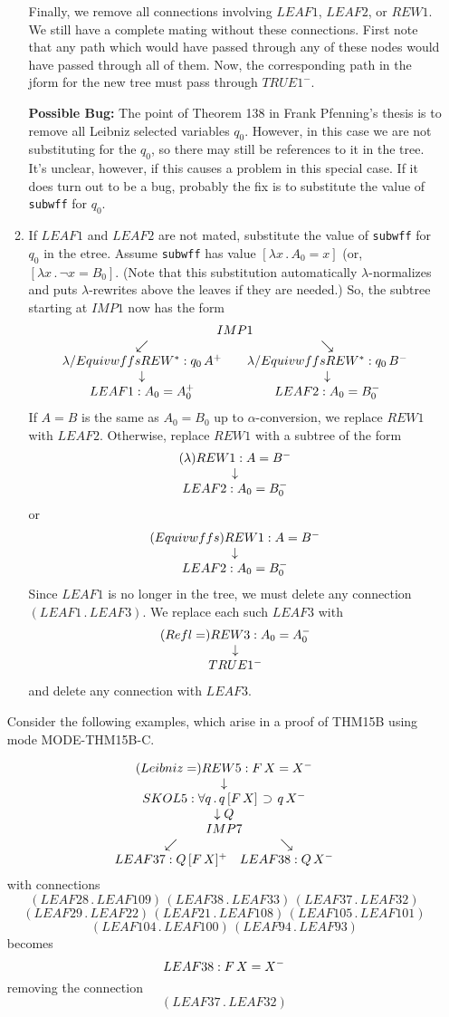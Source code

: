 \begin{enumerate}
\begin{enumerate}
Finally, we remove all connections involving $LEAF1$, $LEAF2$, or
$REW1$.  
We still have a complete mating without these connections.
First note that any path which would have passed through any of these nodes
would have passed through all of them.  Now, the corresponding path
in the jform for the new tree must pass through $TRUE1^-$.

{\bf Possible Bug:}  The point of Theorem 138
in Frank Pfenning's thesis\cite{Pfenning86} is to remove all Leibniz selected variables $q_0$.
However, in this case we are not substituting for the $q_0$, so there may
still be references to it in the tree.  It's unclear, however, if this
causes a problem in this special case.  If it does turn out to be a bug,
probably the fix is to substitute 
the value of \verb+subwff+ for $q_0$.


\item  If $LEAF1$ and $LEAF2$ are not mated, substitute the value of \verb+subwff+
for $q_0$ in the etree.  Assume \verb+subwff+ has value $[\lambda x\, . \, A_0 = x]$ (or, $[\lambda x\, . \, \lnot x = B_0]$.
(Note that this substitution automatically $\lambda$-normalizes and puts $\lambda$-rewrites above the leaves
if they are needed.)  So, the subtree starting at $IMP1$ now has the form
$$\eimp{1}{q_0\, A\, \limplies \, q_0\, B^-}
{\erewstar{\lambda/Equivwffs}{q_0\, A^+}{\eleaf{1}{A_0 = A_0^+}}}
{\erewstar{\lambda/Equivwffs}{q_0\, B^-}{\eleaf{2}{A_0 = B_0^-}}}$$
If $A = B$ is the same as $A_0 = B_0$ up to $\alpha$-conversion,
we replace $REW1$ with $LEAF2$.
Otherwise, replace $REW1$ with a subtree of the form
$$\erew{1}{\lambda}{A = B^-}{\eleaf{2}{A_0 = B_0^-}}$$
or
$$\erew{1}{Equivwffs}{A = B^-}{\eleaf{2}{A_0 = B_0^-}}$$
Since $LEAF1$ is no longer in the tree, we must
delete any connection $(LEAF1 \, . \, LEAF3)$.
We replace each such $LEAF3$ with
$$\erew{3}{Refl=}{A_0 = A_0^-}{\truenode{1^-}}$$
and delete any connection with $LEAF3$.
\end{enumerate}

Consider the following examples, which arise in a proof
of THM15B using mode MODE-THM15B-C.

$$\erew{5}{Leibniz=}{F\, X = X^-}{\skol{5}
{\forall q \, . \, q\, [F\, X] \, \limplies \, q\, X^-}
{Q}
{\eimp{7}{Q\, [F\, X]\,\limplies\, Q\, X^-}
{\eleaf{37}{Q \, [F \, X]^+}}
{\eleaf{38}{Q \, X^-}}}}$$
with connections
$$(LEAF28\, .\, LEAF109)\, (LEAF38\, .\, LEAF33)\, (LEAF37\, .\, LEAF32)$$
$$(LEAF29\, .\, LEAF22)\, (LEAF21\, .\, LEAF108)\, (LEAF105\, .\, LEAF101)$$
$$(LEAF104\, .\, LEAF100)\, (LEAF94\, .\, LEAF93)$$
becomes
$${\eleaf{38}{F\, X = X^-}}$$
removing the connection
$$(LEAF37\, . \, LEAF32)$$


\end{enumerate}
